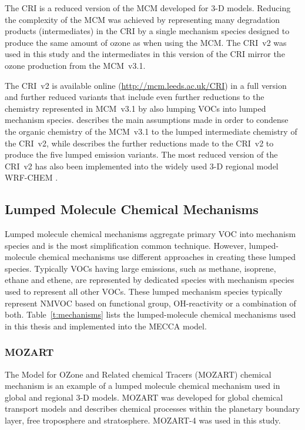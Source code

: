 The CRI is a reduced version of the MCM developed for 3-D models.
Reducing the complexity of the MCM was achieved by representing many degradation products (intermediates) in the CRI by a single mechanism species designed to produce the same amount of ozone as when using the MCM.
The CRI~v2 was used in this study and the intermediates in this version of the CRI mirror the ozone production from the MCM~v3.1.

The CRI~v2 is available online (\mbox{\url{http://mcm.leeds.ac.uk/CRI}}) in a full version and further reduced variants that include even further reductions to the chemistry represented in MCM~v3.1 by also lumping VOCs into lumped mechanism species.
\citet{Jenkin:2008} describes the main assumptions made in order to condense the organic chemistry of the MCM~v3.1 to the lumped intermediate chemistry of the CRI~v2, while \citet{Watson:2008} describes the further reductions made to the CRI~v2 to produce the five lumped emission variants.
The most reduced version of the CRI~v2 has also been implemented into the widely used 3-D regional model WRF-CHEM \citep{Archer-Nicholls:2014}.

\subsection{Lumped Molecule Chemical Mechanisms} \label{ss:lumped_molecule}
Lumped molecule chemical mechanisms aggregate primary VOC into mechanism species and is the most simplification common technique.
However, lumped-molecule chemical mechanisms use different approaches in creating these lumped species.
Typically VOCs having large emissions, such as methane, isoprene, ethane and ethene, are represented by dedicated species with mechanism species used to represent all other VOCs.
These lumped mechanism species typically represent NMVOC based on functional group, OH-reactivity or a combination of both.
Table~\ref{t:mechanisms} lists the lumped-molecule chemical mechanisms used in this thesis and implemented into the MECCA model.

\subsubsection{MOZART}
The Model for OZone and Related chemical Tracers (MOZART) chemical mechanism is an example of a lumped molecule chemical mechanism used in global and regional 3-D models.
MOZART was developed for global chemical transport models and describes chemical processes within the planetary boundary layer, free troposphere and stratosphere.
MOZART-4 \citep{Emmons:2010} was used in this study.

